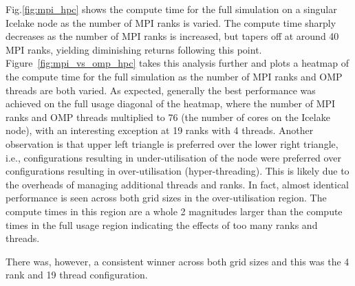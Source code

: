 Fig.\eqref{fig:mpi_hpc} shows the compute time for the full simulation on a singular Icelake node as the number of MPI
ranks is varied.
The compute time sharply decreases as the number of MPI ranks is increased, but tapers off at around 40 MPI ranks,
yielding diminishing returns following this point.
Figure~\eqref{fig:mpi_vs_omp_hpc} takes this analysis further and plots a heatmap of the compute time for the full
simulation as the number of MPI ranks and OMP threads are both varied.
As expected, generally the best performance was achieved on the full usage diagonal of the heatmap, where the number of
MPI ranks and OMP threads multiplied to 76 (the number of cores on the Icelake node), with an interesting exception at
19 ranks with 4 threads.
Another observation is that upper left triangle is preferred over the lower right triangle, i.e.,
configurations resulting in under-utilisation of the node were preferred over configurations resulting in over-utilisation
(hyper-threading).
This is likely due to the overheads of managing additional threads and ranks.
In fact, almost identical performance is seen across both grid sizes in the over-utilisation region.
The compute times in this region are a whole 2 magnitudes larger than the compute times in the full usage region indicating
the effects of too many ranks and threads.

There was, however, a consistent winner across both grid sizes and this was the 4 rank and 19 thread configuration.








